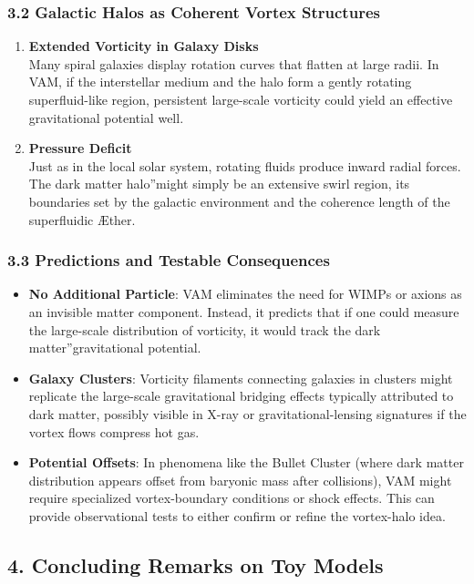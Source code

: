 \subsubsection*{3.2 Galactic Halos as Coherent Vortex Structures}
\begin{enumerate}
    \item \textbf{Extended Vorticity in Galaxy Disks} \\
    Many spiral galaxies display rotation curves that flatten at large radii. In VAM, if the interstellar medium and the halo form a gently rotating superfluid-like region, persistent large-scale vorticity could yield an effective gravitational potential well.
    \item \textbf{Pressure Deficit} \\
    Just as in the local solar system, rotating fluids produce inward radial forces. The \grqq dark matter halo\textquotedblright might simply be an extensive swirl region, its boundaries set by the galactic environment and the coherence length of the superfluidic Æther.
\end{enumerate}

\subsubsection*{3.3 Predictions and Testable Consequences}
\begin{itemize}
    \item \textbf{No Additional Particle}: VAM eliminates the need for WIMPs or axions as an invisible matter component. Instead, it predicts that if one could measure the large-scale distribution of vorticity, it would track the \grqq dark matter\textquotedblright gravitational potential.
    \item \textbf{Galaxy Clusters}: Vorticity filaments connecting galaxies in clusters might replicate the large-scale gravitational bridging effects typically attributed to dark matter, possibly visible in X-ray or gravitational-lensing signatures if the vortex flows compress hot gas.
    \item \textbf{Potential Offsets}: In phenomena like the Bullet Cluster (where dark matter distribution appears offset from baryonic mass after collisions), VAM might require specialized vortex-boundary conditions or shock effects. This can provide observational tests to either confirm or refine the vortex-halo idea.
\end{itemize}

\subsection*{4. Concluding Remarks on Toy Models}

